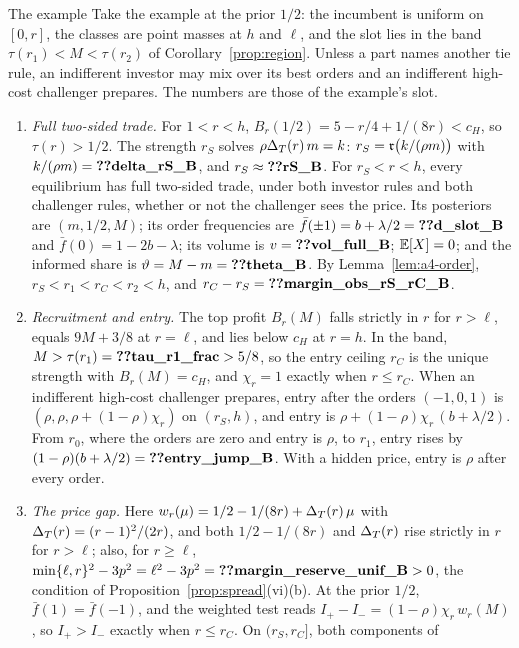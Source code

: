 \begin{named}{The example}
Take the example at the prior \(1/2\): the incumbent is uniform on \([0,r]\), the classes are point masses at \(h\)
and \(\ell\), and the slot lies in the band \(\tau(r_1)<M<\tau(r_2)\) of Corollary~\ref{prop:region}. Unless a part
names another tie rule, an indifferent investor may mix over its best orders and an indifferent high-cost challenger
prepares. The numbers are those of the example's slot.
\begin{enumerate}[label=(\alph*),leftmargin=2em]
\item \emph{Full two-sided trade.} For \(1<r<h\), \(B_r(1/2)=5-r/4+1/(8r)<c_H\), so \(\tau(r)>1/2\). The strength
\(r_S\) solves \(\rho\Delta_T(r)\,m=k\): \(r_S=\mathfrak{r}\bigl(k/(\rho m)\bigr)\) with \(k/(\rho m)=\reg{delta_rS_B}\), and
\(r_S\approx\reg{rS_B}\). For \(r_S<r<h\), every equilibrium has full two-sided trade, under both investor rules and
both challenger rules, whether or not the challenger sees the price. Its posteriors are \((m,1/2,M)\); its order
frequencies are \(\bar f(\pm1)=b+\lambda/2=\reg{d_slot_B}\) and \(\bar f(0)=1-2b-\lambda\); its volume is
\(v=\reg{vol_full_B}\); \(\mathbb{E}[X]=0\); and the informed share is \(\vartheta=M-m=\reg{theta_B}\). By
Lemma~\ref{lem:a4-order}, \(r_S<r_1<r_C<r_2<h\), and \(r_C-r_S=\reg{margin_obs_rS_rC_B}\).
\item \emph{Recruitment and entry.} The top profit \(B_r(M)\) falls strictly in \(r\) for \(r>\ell\), equals
\(9M+3/8\) at \(r=\ell\), and lies below \(c_H\) at \(r=h\). In the band, \(M>\tau(r_1)=\reg{tau_r1_frac}>5/8\), so
the entry ceiling \(r_C\) is the unique strength with \(B_r(M)=c_H\), and \(\chi_r=1\) exactly when \(r\le r_C\).
When an indifferent high-cost challenger prepares, entry after the orders \((-1,0,1)\) is
\((\rho,\rho,\rho+(1-\rho)\chi_r)\) on \((r_S,h)\), and entry is \(\rho+(1-\rho)\chi_r\,(b+\lambda/2)\). From \(r_0\),
where the orders are zero and entry is \(\rho\), to \(r_1\), entry rises by \((1-\rho)(b+\lambda/2)=\reg{entry_jump_B}\).
With a hidden price, entry is \(\rho\) after every order.
\item \emph{The price gap.} Here \(w_r(\mu)=1/2-1/(8r)+\Delta_T(r)\,\mu\) with \(\Delta_T(r)=(r-1)^2/(2r)\), and both
\(1/2-1/(8r)\) and \(\Delta_T(r)\) rise strictly in \(r\) for \(r>\ell\); also, for \(r\ge\ell\),
\(\min\{\ell,r\}^2-3p^2=\ell^2-3p^2=\reg{margin_reserve_unif_B}>0\), the condition of
Proposition~\ref{prop:spread}(vi)(b). At the prior \(1/2\), \(\bar f(1)=\bar f(-1)\), and the weighted test reads
\(I_+-I_-=(1-\rho)\chi_r\,w_r(M)\), so \(I_+>I_-\) exactly when \(r\le r_C\). On \((r_S,r_C]\), both components of

\end{enumerate}
\end{named}

